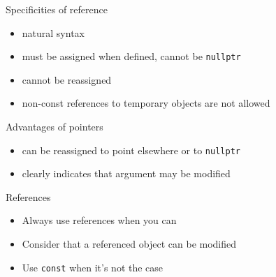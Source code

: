 \begin{frame}[fragile]
  \begin{block}{Specificities of reference}
    \begin{itemize}
    \item natural syntax
    \item must be assigned when defined, cannot be \texttt{nullptr}
    \item cannot be reassigned
    \item non-const references to temporary objects are not allowed
    \end{itemize}
  \end{block}
  \begin{block}{Advantages of pointers}
    \begin{itemize}
    \item can be reassigned to point elsewhere or to \texttt{nullptr}
    \item clearly indicates that argument may be modified
    \end{itemize}
  \end{block}
  \pause
  \begin{goodpractice}{References}
    \begin{itemize}
      \item Always use references when you can
      \item Consider that a referenced object can be modified
      \item Use \texttt{const} when it's not the case
    \end{itemize}
  \end{goodpractice}
\end{frame}
